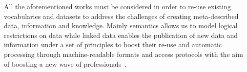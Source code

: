 All the aforementioned works must be considered in order to re-use existing vocabularies and datasets to address 
the challenges of creating meta-described data, information and knowledge. Mainly semantics allows us to model logical restrictions 
on data while linked data enables the publication of new data and information under a set of principles 
to boost their re-use and automatic processing through machine-readable formats and access protocols with the aim of boosting 
a new wave of professionals~\cite{DBLP:journals/ijhcitp/PalaciosSAG12}.


% 



